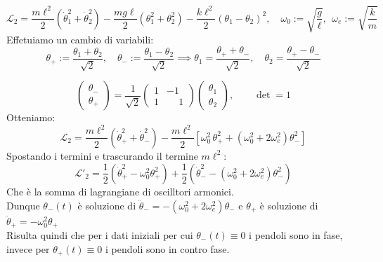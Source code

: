\begin{equation}
    \mathcal{L}_2=\frac{m\ell^2}{2}\left(\dot{\theta}_1^2+\dot{\theta}_2^2\right)
    -\frac{mg\ell}{2}\left(\theta_1^2+\theta_2^2\right)
    -\frac{k\ell^2}{2}\left(\theta_1-\theta_2\right)^2,
    \quad \omega_0:=\sqrt{\frac{g}{\ell}},\ \ \omega_e:=\sqrt{\frac{k}{m}}
\end{equation}
Effetuiamo un cambio di variabili: 
\begin{equation}
    \theta_+:=\frac{\theta_1+\theta_2}{\sqrt{2}},\quad
    \theta_-:=\frac{\theta_1-\theta_2}{\sqrt{2}}
    \implies
    \theta_1=\frac{\theta_+ + \theta_-}{\sqrt{2}},\quad
    \theta_2=\frac{\theta_+ - \theta_-}{\sqrt{2}}
\end{equation}

\begin{equation*}
    \begin{pmatrix}\theta_-\\ \theta_+\end{pmatrix}
    =\frac{1}{\sqrt{2}}
    \begin{pmatrix}
        1 & -1\\
        1 & \phantom{-}1
    \end{pmatrix}
    \begin{pmatrix}\theta_1\\ \theta_2\end{pmatrix},
    \qquad \det=1
\end{equation*}
Otteniamo:
\begin{equation}
    \mathcal{L}_2=\frac{m\ell^2}{2}\left(\dot{\theta}_+^2+\dot{\theta}_-^2\right)
    -\frac{m\ell^2}{2}\left[\omega_0^2\,\theta_+^2+\left(\omega_0^2+2\omega_e^2\right)\theta_-^2\right]
\end{equation}
Spostando i termini e trascurando il termine $m\ell^2$:
\begin{equation}
    \mathcal{L}'_2= \frac{1}{2}\left(\dot{\theta}_+^2-\omega_0^2\theta_+^2\right)+ \frac{1}{2}\left(\dot{\theta}_-^2- (\omega_0^2+2\omega_e^2)\theta_-^2\right)
\end{equation}
Che è la somma di lagrangiane di oscilltori armonici.\\
Dunque $\theta_-(t)$ è soluzione di $\ddot{\theta}_-= - (\omega_0^2+2\omega_e^2)\theta_- $
e $\theta_+$ è soluzione  di $\ddot{\theta}_+=-\omega_0^2\theta_+$\\
Risulta quindi che per i dati iniziali per cui $\theta_-(t)\equiv0$ i pendoli sono in fase, 
invece per $\theta_+(t)\equiv0$ i pendoli sono in contro fase.

